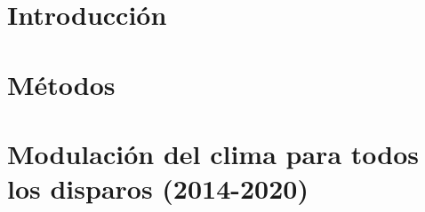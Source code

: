 \documentclass{ibtesis}
\begin{document}
\chapter{Introducción}
\graphicspath{{0_Introduccion/}}



\chapter{Métodos}
\graphicspath{{1_Metodo/}}




% 


% 

% 

% 


\chapter{Modulación del clima para todos los disparos (2014-2020)}
\graphicspath{{4_Weather_Modulation/}}



% 
\end{document}
